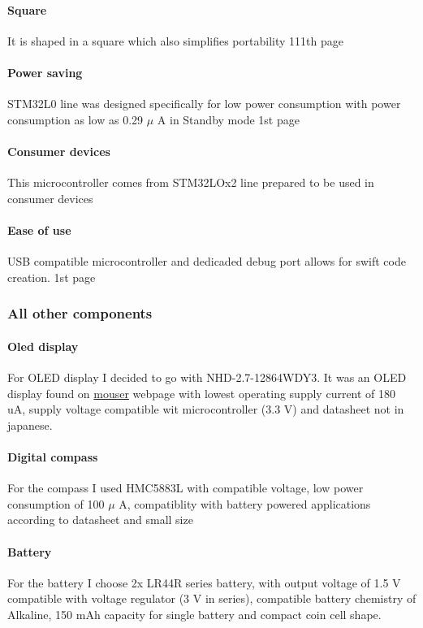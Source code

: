 \documentclass{article}
\begin{document}
\paragraph{Square} It is shaped in a square which also simplifies portability
\cite{datasheet} 111th page
\paragraph{Power saving} STM32L0 line was designed specifically for low power
consumption with power consumption as low as 0.29 $\mu$ A in Standby mode
\cite{datasheet} 1st page
\paragraph{Consumer devices} This microcontroller comes from STM32LOx2 line
prepared to be used in consumer devices \cite{consumerDevice}
\paragraph{Ease of use} USB compatible microcontroller and dedicaded debug port
allows for swift code creation.
\cite{datasheet} 1st page 
\subsubsection{All other components}
\paragraph{Oled display} For OLED display I decided to go with
NHD-2.7-12864WDY3. It was an OLED display found on \href{www.mouser.pl}{mouser}
webpage with lowest operating supply current of 180 uA, supply voltage
compatible wit microcontroller (3.3 V) and datasheet not in japanese.
\cite{OLED}
\paragraph{Digital compass} For the compass I used HMC5883L with compatible
voltage, low power consumption of 100 $\mu$ A, compatiblity with battery powered
applications according to datasheet and small size 
\paragraph{Battery} For the battery I choose 2x LR44R series battery, with output
voltage of 1.5 V compatible with voltage regulator (3 V in series), compatible
battery chemistry of Alkaline, 150 mAh capacity for single battery and compact
coin cell shape. \cite{Battery}
\end{document}
